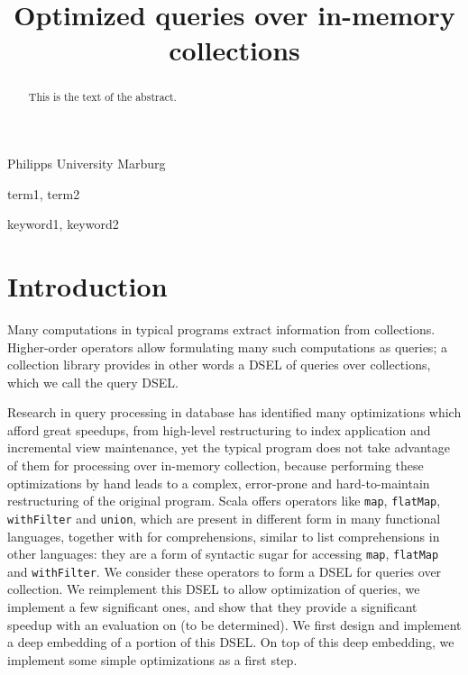 \documentclass[preprint,authoryear,10pt]{sigplanconf}
\begin{document}
\copyrightdata{[to be supplied]} 


\title{Optimized queries over in-memory collections}

	   {Philipps University Marburg}

\maketitle

\begin{abstract}
This is the text of the abstract.
\end{abstract}


\terms
term1, term2

\keywords
keyword1, keyword2




\section{Introduction}

Many computations in typical programs extract information from
collections. Higher-order operators allow formulating many such
computations as queries; a collection library provides in other words a
DSEL of queries over collections, which we call the query DSEL.

Research in query processing in database has identified many
optimizations which afford great speedups, from high-level restructuring
to index application and incremental view maintenance, yet the typical
program does not take advantage of them for processing over in-memory
collection, because performing these optimizations by hand leads to a
complex, error-prone and hard-to-maintain restructuring of the original
program. Scala offers operators like \texttt{map}, \texttt{flatMap},
\texttt{withFilter} and \texttt{union}, which are present in different
form in many functional languages, together with for comprehensions,
similar to list comprehensions in other languages: they are a form of
syntactic sugar for accessing \texttt{map}, \texttt{flatMap} and
\texttt{withFilter}. We consider these operators to form a DSEL for
queries over collection. We reimplement this DSEL to allow optimization
of queries, we implement a few significant ones, and show that they
provide a significant speedup with an evaluation on (to be determined).
We first design and implement a deep embedding of a portion of this
DSEL. On top of this deep embedding, we implement some simple
optimizations as a first step.
\end{document}

